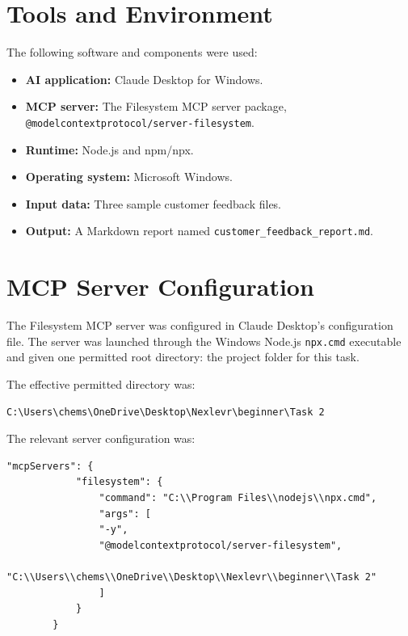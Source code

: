 \documentclass[12pt,a4paper]{article}
\begin{document}
	\section{Tools and Environment}
	
	The following software and components were used:
	\begin{itemize}
		\item \textbf{AI application:} Claude Desktop for Windows.
		\item \textbf{MCP server:} The Filesystem MCP server package, \texttt{@modelcontextprotocol/server-filesystem}.
		\item \textbf{Runtime:} Node.js and npm/npx.
		\item \textbf{Operating system:} Microsoft Windows.
		\item \textbf{Input data:} Three sample customer feedback files.
		\item \textbf{Output:} A Markdown report named \texttt{customer\_feedback\_report.md}.
	\end{itemize}
	
	\section{MCP Server Configuration}
	
	The Filesystem MCP server was configured in Claude Desktop's configuration file. The server was launched through the Windows Node.js \texttt{npx.cmd} executable and given one permitted root directory: the project folder for this task.
	
	The effective permitted directory was:
	\begin{lstlisting}[style=terminal]
		C:\Users\chems\OneDrive\Desktop\Nexlevr\beginner\Task 2
	\end{lstlisting}
	
	The relevant server configuration was:
	\begin{lstlisting}[style=json]
		"mcpServers": {
			"filesystem": {
				"command": "C:\\Program Files\\nodejs\\npx.cmd",
				"args": [
				"-y",
				"@modelcontextprotocol/server-filesystem",
				"C:\\Users\\chems\\OneDrive\\Desktop\\Nexlevr\\beginner\\Task 2"
				]
			}
		}
	\end{lstlisting}
	
\end{document}
